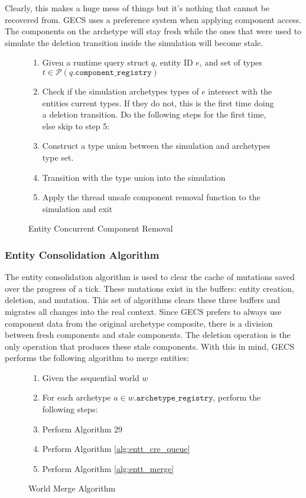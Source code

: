 Clearly, this makes a huge mess of things but it's nothing that cannot be recovered from. GECS uses a preference system when applying component access. The components on the archetype will stay fresh while the ones that were used to simulate the deletion transition inside the simulation will become stale. 

\begin{figure}[htbp]
    \begin{enumerate}
        \item Given a runtime query struct $q$, entity ID $e$, and set of types $t \in \mathcal{P}(q.\texttt{component\_registry})$
        \item Check if the simulation archetypes types of $e$ intersect with the entities current types. If they do not, this is the first time doing a deletion transition. Do the following steps for the first time, else skip to step 5:
        \item Construct a type union between the simulation and archetypes type set. 
        \item Transition with the type union into the simulation
        \item Apply the thread unsafe component removal function to the simulation and exit
\end{enumerate}
\caption{Entity Concurrent Component Removal}
\label{alg:conc_rem}
\end{figure}

\subsubsection{Entity Consolidation Algorithm}

The entity consolidation algorithm is used to clear the cache of mutations saved over the progress of a tick. These mutations exist in the buffers: entity creation, deletion, and mutation. This set of algorithms clears these three buffers and migrates all changes into the real context. Since GECS prefers to always use component data from the original archetype composite, there is a division between fresh components and stale components. The deletion operation is the only operation that produces these stale components. With this in mind, GECS performs the following algorithm to merge entities:

\begin{figure}[H]
    \begin{enumerate}
        \item Given the sequential world $w$
        \item For each archetype $a \in w.\texttt{archetype\_registry}$, perform the following steps:
        \item Perform Algorithm 29
        \item Perform Algorithm \ref{alg:entt_cre_queue}
        \item Perform Algorithm \ref{alg:entt_merge}
\end{enumerate}
\caption{World Merge Algorithm}
\label{alg:world_merge}
\end{figure}

